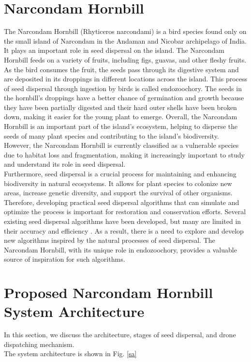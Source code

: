 \documentclass[conference]{IEEEtran}
\begin{document}
\section{Narcondam Hornbill}
The Narcondam Hornbill (Rhyticeros narcondami) is a bird species found only on the small island of Narcondam\cite{5} in the Andaman and Nicobar archipelago of India. It plays an important role in seed dispersal on the island. The Narcondam Hornbill feeds on a variety of fruits, including figs, guavas, and other fleshy fruits. As the bird consumes the fruit, the seeds pass through its digestive system and are deposited in its droppings in different locations across the island. This process of seed dispersal through ingestion by birds is called endozoochory. The seeds in the hornbill's droppings have a better chance of germination and growth because they have been partially digested and their hard outer shells have been broken down, making it easier for the young plant to emerge. Overall, the Narcondam Hornbill is an important part of the island's ecosystem, helping to disperse the seeds of many plant species and contributing to the island's biodiversity. However, the Narcondam Hornbill is currently classified as a vulnerable species due to habitat loss and fragmentation, making it increasingly important to study and understand its role in seed dispersal.
\\Furthermore, seed dispersal is a crucial process for maintaining and enhancing biodiversity in natural ecosystems. It allows for plant species to colonize new areas, increase genetic diversity, and support the survival of other organisms. Therefore, developing practical seed dispersal algorithms that can simulate and optimize the process is important for restoration and conservation efforts. Several existing seed dispersal algorithms have been developed, but many are limited in their accuracy and efficiency \cite{6}. As a result, there is a need to explore and develop new algorithms inspired by the natural processes of seed dispersal. The Narcondam Hornbill, with its unique role in endozoochory, provides a valuable source of inspiration for such algorithms.

\section{Proposed Narcondam Hornbill System Architecture}

In this section, we discuss the architecture, stages of seed dispersal, and drone dispatching mechanism.
\\The system architecture is shown in Fig. \ref{sa}
\end{document}
